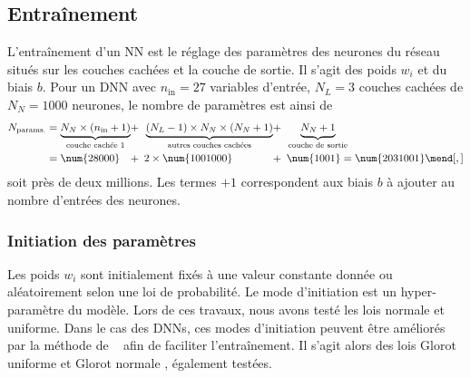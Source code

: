 \subsection{Entraînement}\label{chapter-ML-section-DNN-training}
L'entraînement d'un NN est le réglage des paramètres des neurones du réseau situés sur les couches cachées et la couche de sortie.
Il s'agit des poids $w_i$ et du biais $b$.
Pour un DNN avec
$n_\text{in} = \num{27}$ variables d'entrée,
$N_L = \num{3}$ couches cachées
de $N_N = \num{1000}$ neurones,
le nombre de paramètres est ainsi de
\begin{align}
N_\text{params.}
&= \underbrace{N_N \times (n_\text{in} + 1)}_\text{couche cachée 1} \!\!\!&\!\!\!+\,\,\,& \underbrace{(N_L -1)\times N_N \times(N_N+1)}_\text{autres couches cachées} \!\!\!&\!\!\!+\,\,\,& \underbrace{N_N +1\vphantom{()}}_\text{couche de sortie}
\nonumber\\&
=
\num{28000} \!\!\!&\!\!\!+\,\,\,& 2\times\num{1001000} \!\!\!&\!\!\!+\,\,\,& \num{1001}
=
\num{2031001}
\mend[,]
\end{align}
soit près de deux millions.
Les termes \og $+1$ \fg{} correspondent aux biais $b$ à ajouter au nombre d'entrées des neurones.
\subsubsection{Initiation des paramètres}
Les poids $w_i$ sont initialement fixés à une valeur constante donnée ou aléatoirement selon une loi de probabilité.
Le mode d'initiation est un hyper-paramètre du modèle.
Lors de ces travaux, nous avons testé les lois normale et uniforme.
Dans le cas des DNNs, ces modes d'initiation peuvent être améliorés par la méthode de \citeauthor{glorot}~\cite{glorot} afin de faciliter l'entraînement.
Il s'agit alors des lois \og Glorot uniforme \fg{} et \og Glorot normale \fg, également testées.

